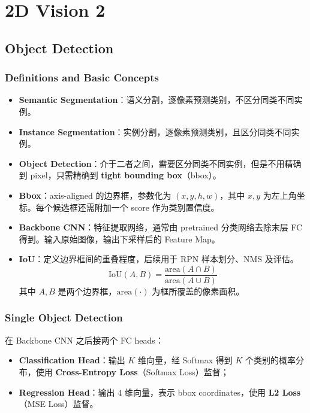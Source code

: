 \section{2D Vision 2}\label{d-vision-2}

\subsection{Object Detection}\label{object-detection}

\subsubsection{Definitions and Basic
Concepts}\label{definitions-and-basic-concepts}

\begin{itemize}
\tightlist
\item
  \textbf{Semantic
  Segmentation}：语义分割，逐像素预测类别，不区分同类不同实例。
\item
  \textbf{Instance
  Segmentation}：实例分割，逐像素预测类别，且区分同类不同实例。
\item
  \textbf{Object
  Detection}：介于二者之间，需要区分同类不同实例，但是不用精确到
  pixel，只需精确到 \textbf{tight bounding box}（bbox）。
\item
  \textbf{Bbox}：axis-aligned 的边界框，参数化为 \((x, y, h, w)\)，其中
  \(x, y\) 为左上角坐标。每个候选框还需附加一个 score 作为类别置信度。
\item
  \textbf{Backbone CNN}：特征提取网络，通常由 pretrained
  分类网络去除末层 FC 得到。输入原始图像，输出下采样后的 Feature Map。
\item
  \textbf{IoU}：定义边界框间的重叠程度，后续用于 RPN 样本划分、NMS
  及评估。 \[
    \text{IoU}(A,B) = \frac{\text{area}(A\cap B)}{\text{area}(A\cup B)}
    \] 其中 \(A,B\) 是两个边界框，\(\text{area}(\cdot)\)
  为框所覆盖的像素面积。
\end{itemize}

\subsubsection{Single Object Detection}\label{single-object-detection}

在 Backbone CNN 之后接两个 FC heads：

\begin{itemize}
\tightlist
\item
  \textbf{Classification Head}：输出 \(K\) 维向量，经 Softmax 得到 \(K\)
  个类别的概率分布，使用 \textbf{Cross-Entropy Loss}（Softmax
  Loss）监督；
\item
  \textbf{Regression Head}：输出 \(4\) 维向量，表示 bbox
  coordinates，使用 \textbf{L2 Loss}（MSE Loss）监督。
\end{itemize}

